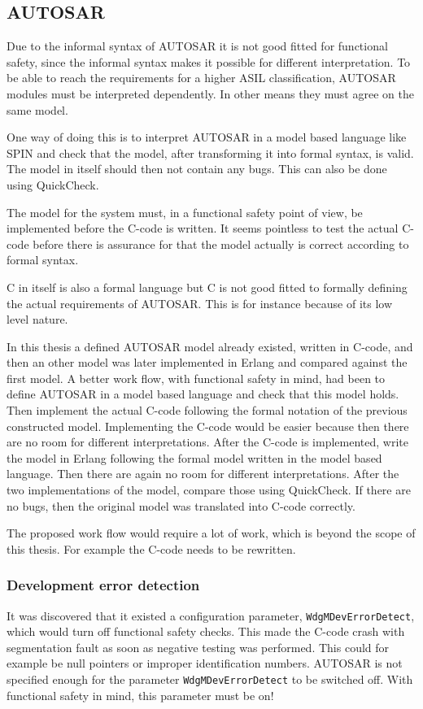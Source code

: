 \subsection{AUTOSAR}
Due to the informal syntax of AUTOSAR it is not good fitted for
functional safety, since the informal syntax makes it possible for
different interpretation. To be able to reach the requirements for a higher
ASIL classification, AUTOSAR modules must be interpreted dependently. In other
means they must agree on the same model.

One way of doing this is to interpret AUTOSAR in a model based
language like SPIN and check that the model, after transforming it
into formal syntax, is valid. The model in itself should then not
contain any bugs. This can also be done using QuickCheck.

The model for the system must, in a functional safety
point of view, be implemented before the C-code is written. It seems
pointless to test the actual C-code before there is assurance for that
the model actually is correct according to formal syntax.

C in itself is also a formal language but C is not good fitted to
formally defining the actual requirements of AUTOSAR. This is for
instance because of its low level nature.

In this thesis a defined AUTOSAR model already existed, written in
C-code, and then an other model was later implemented in Erlang and
compared against the first model. A better work flow, with functional
safety in mind, had been to define AUTOSAR in a model based language
and check that this model holds. Then implement the actual C-code
following the formal notation of the previous constructed
model. Implementing the C-code would be easier because then there are
no room for different interpretations. After the C-code is
implemented, write the model in Erlang following the formal model
written in the model based language. Then there are again no room for
different interpretations. After the two implementations of the model,
compare those using QuickCheck. If there are no bugs, then the
original model was translated into C-code correctly.

The proposed work flow would require a lot of work, which is beyond the scope of
this thesis. For example the C-code needs to be rewritten.

\subsubsection{Development error detection}
\label{SEC:DEVERRORDETECT}
It was discovered that it existed a configuration parameter,
\lstinline!WdgMDevErrorDetect!, which would turn off functional safety
checks. This made the C-code crash with segmentation fault as soon as
negative testing was performed. This could for example be null pointers or
improper identification numbers. AUTOSAR is not specified enough for
the parameter \lstinline!WdgMDevErrorDetect!  to be switched off. With
functional safety in mind, this parameter must be on!

